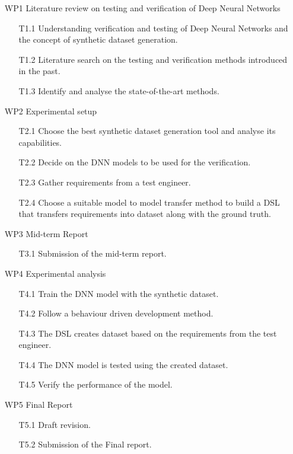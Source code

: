 \documentclass[rnd]{mas_proposal}
\begin{document}
\begin{enumerate}
    \item[WP1] Literature review on testing and verification of Deep Neural Networks
    \begin{itemize}
        \item[T1.1] Understanding verification and testing of Deep Neural Networks and the concept of synthetic dataset generation.
        \item[T1.2] Literature search on the testing and verification methods introduced in the past.
        \item[T1.3] Identify and analyse the state-of-the-art methods.
    \end{itemize}
    \item[WP2] Experimental setup
    \begin{itemize}
        \item[T2.1] Choose the best synthetic dataset generation tool and analyse its capabilities.
        \item[T2.2] Decide on the DNN models to be used for the verification.
        \item[T2.3] Gather requirements from a test engineer.
        \item[T2.4] Choose a suitable model to model transfer method to build a DSL that transfers requirements into dataset along with the ground truth.
    \end{itemize}
    \item[WP3] Mid-term Report
    \begin{itemize}
        \item[T3.1] Submission of the mid-term report.
    \end{itemize}
    \item[WP4] Experimental analysis
    \begin{itemize}
        \item[T4.1] Train the DNN model with the synthetic dataset.
        \item[T4.2] Follow a behaviour driven development method.
        \item[T4.3] The DSL creates dataset based on the requirements from the test engineer.
        \item[T4.4] The DNN model is tested using the created dataset.
        \item[T4.5] Verify the performance of the model.
    \end{itemize}
    \item[WP5] Final Report
    \begin{itemize}
        \item[T5.1] Draft revision.
        \item[T5.2] Submission of the Final report.
    \end{itemize}
    
\end{enumerate}
\end{document}
